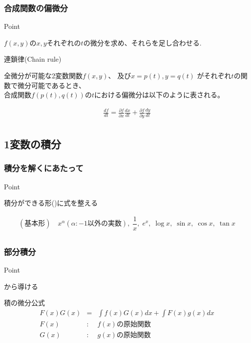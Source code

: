 \documentclass[a4paper]{jsarticle}
\begin{document}
\subsubsection{合成関数の偏微分}
\begin{itembox}[l]{Point}
    \begin{center}
        $f\left(x,y\right)$の$x,y$それぞれの$t$の微分を求め、それらを足し合わせる.
    \end{center}
\end{itembox}
\begin{itembox}[l]{連鎖律(Chain rule)}
    \begin{center}
        全微分が可能な2変数関数$f\left(x,y\right)$、
        及び$x=p\left(t\right),y=q\left(t\right)$ がそれぞれ$t$の関数で微分可能であるとき、\\
        合成関数$f\left(p\left(t\right),q\left(t\right)\right)$の$t$における偏微分は以下のように表される。
    \end{center}
    \begin{eqnarray*}
        \frac{df}{dt}=\frac{\partial f}{\partial x}\frac{dx}{dt} + \frac{\partial f}{\partial y}\frac{dy}{dt}\\
    \end{eqnarray*}
\end{itembox}
\subsection{1変数の積分}
\subsubsection{積分を解くにあたって}
\begin{itembox}[l]{Point}
    \begin{center}
        積分ができる形()に式を整える\\
    \end{center}
    \begin{eqnarray*}
        (基本形)\quad x^\alpha\!(\alpha:-1以外の実数),\; \dfrac{1}{x},\; e^x,\; \log x,\; \sin x,\; \cos x,\; \tan x\\
    \end{eqnarray*}
\end{itembox}
\subsubsection{部分積分}
\begin{itembox}[l]{Point}
    \begin{center}
        から導ける
    \end{center}
\end{itembox}
\begin{itembox}[l]{積の微分公式}
    \begin{eqnarray*}
        F\left(x\right)G\left(x\right)&=&\displaystyle\int f\left(x\right)G\left(x\right)dx+\int F\left(x\right)g\left(x\right)dx\\
        F\left(x\right)&:&f\left(x\right)の原始関数\\
        G\left(x\right)&:&g\left(x\right)の原始関数\\
    \end{eqnarray*}
\end{itembox}
\end{document}
